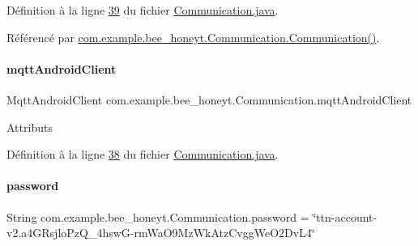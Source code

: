 Définition à la ligne \hyperlink{_communication_8java_source_l00039}{39} du fichier \hyperlink{_communication_8java_source}{Communication.\+java}.



Référencé par \hyperlink{_communication_8java_source_l00063}{com.\+example.\+bee\+\_\+honeyt.\+Communication.\+Communication()}.

\mbox{\label{classcom_1_1example_1_1bee__honeyt_1_1_communication_a86db63a356e4638c1d39c54bbe64f0e1}} 
\paragraph{\texorpdfstring{mqtt\+Android\+Client}{mqttAndroidClient}}
{\footnotesize\ttfamily Mqtt\+Android\+Client com.\+example.\+bee\+\_\+honeyt.\+Communication.\+mqtt\+Android\+Client\hspace{0.3cm}{\ttfamily [static]}}

Attributs 

Définition à la ligne \hyperlink{_communication_8java_source_l00038}{38} du fichier \hyperlink{_communication_8java_source}{Communication.\+java}.

\mbox{\label{classcom_1_1example_1_1bee__honeyt_1_1_communication_ace9fdd48d010e4c43cb5d32767207cae}} 
\paragraph{\texorpdfstring{password}{password}}
{\footnotesize\ttfamily String com.\+example.\+bee\+\_\+honeyt.\+Communication.\+password = \char`\"{}ttn-\/account-\/v2.\+a4\+G\+Rsjlo\+Pz\+Q\+\_\+4hswG-\/rm\+Wa\+O9\+Mz\+Wk\+Atz\+Cvgg\+We\+O2\+Dv\+L4\char`\"{}\hspace{0.3cm}{\ttfamily [private]}}



